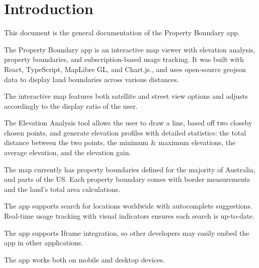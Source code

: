%
%
%
%
%
%
%
%

\chapter{Introduction} \label{ch:introduction}

This document is the general documentation of the Property Boundary app. 

The Property Boundary app is an interactive map viewer with elevation analysis, property boundaries, and subscription-based usage tracking. It was built with React, TypeScript, MapLibre GL, and Chart.js., and uses open-source geojson data to display land boundaries across various distances.

The interactive map features both satellite and street view options and adjusts accordingly to the display ratio of the user.

The Elevation Analysis tool allows the user to draw a line, based off two closeby chosen points, and generate elevation profiles with detailed statistics: the total distance between the two points, the minimum \& maximum elevations, the average elevation, and the elevation gain.

The map currently has property boundaries defined for the majority of Australia, and parts of the US. Each property boundary comes with border measurements and the land's total area calculations.

The app supports search for locations worldwide with autocomplete suggestions. Real-time usage tracking with visual indicators ensures each search is up-to-date.

The app supports Iframe integration, so other developers may easily embed the app in other applications.

The app works both on mobile and desktop devices. \cite{github}